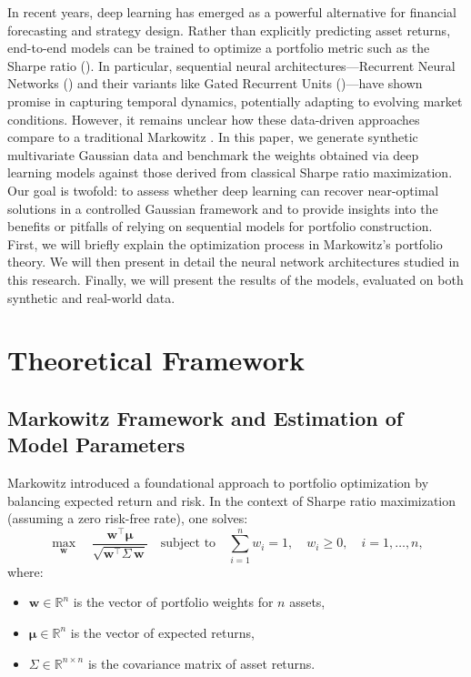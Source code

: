 \documentclass[11pt]{article}
\begin{document}
In recent years, deep learning has emerged as a powerful alternative for financial forecasting and strategy design. Rather than explicitly predicting asset returns, end-to-end models can be trained to optimize a portfolio metric such as the Sharpe ratio (\cite{zhang2020deep}). In particular, sequential neural architectures—Recurrent Neural Networks (\cite{rnnpaper}) and their variants like Gated Recurrent Units (\cite{grupaper})—have shown promise in capturing temporal dynamics, potentially adapting to evolving market conditions. However, it remains unclear how these data-driven approaches compare to a traditional Markowitz . In this paper, we generate synthetic multivariate Gaussian data and benchmark the weights obtained via deep learning models against those derived from classical Sharpe ratio maximization. Our goal is twofold: to assess whether deep learning can recover near-optimal solutions in a controlled Gaussian framework and to provide insights into the benefits or pitfalls of relying on sequential models for portfolio construction. First, we will briefly explain the optimization process in Markowitz's portfolio theory. We will then present in detail the neural network architectures studied in this research. Finally, we will present the results of the models, evaluated on both synthetic and real-world data.  

\section{Theoretical Framework}

\subsection{Markowitz Framework and Estimation of Model Parameters}

Markowitz introduced a foundational approach to portfolio optimization by balancing expected return and risk. In the context of Sharpe ratio maximization (assuming a zero risk-free rate), one solves:
\begin{equation}\label{eq:markowitz_objective}
    \max_{\mathbf{w}} \quad 
    \frac{\mathbf{w}^{\top} \boldsymbol{\mu}}{\sqrt{\mathbf{w}^{\top} \Sigma \, \mathbf{w}}}
    \quad 
    \text{subject to} 
    \quad
    \sum_{i=1}^{n} w_{i} = 1,
    \quad w_i \ge 0, \quad i=1, \dots, n,
\end{equation}
where:
\begin{itemize}
    \item \(\mathbf{w} \in \mathbb{R}^n\) is the vector of portfolio weights for \(n\) assets,
    \item \(\boldsymbol{\mu} \in \mathbb{R}^n\) is the vector of expected returns,
    \item \(\Sigma \in \mathbb{R}^{n \times n}\) is the covariance matrix of asset returns.
\end{itemize}
\end{document}
